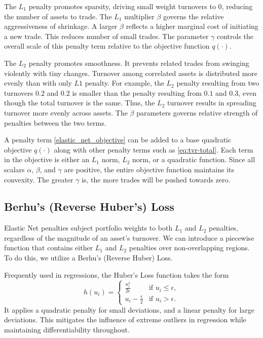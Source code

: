 \documentclass[11pt, letterpaper]{article}
\begin{document}
The $L_1$ penalty promotes sparsity, driving small weight turnovers to $0$, reducing the number of assets to trade. The $L_1$
multiplier $\beta$ governs the relative aggressiveness of shrinkage. A larger $\beta$ reflects a higher marginal cost of
initiating a new trade. This reduces number of small trades. The parameter $\gamma$ controls the overall scale of this penalty
term relative to the objective function $q(\cdot)$.

The ${L_2}$ penalty promotes smoothness. It prevents related trades from swinging violently with tiny changes. Turnover among
correlated assets is distributed more evenly than with only $L1$ penalty. For example, the $L_2$ penalty resulting from two
turnovers $0.2$ and $0.2$ is smaller than the penalty resulting from $0.1$ and $0.3$, even though the total turnover is the
same. Thus, the $L_2$ turnover results in spreading turnover more evenly across assets. The $\beta$ parameters governs relative
strength of penalties between the two terms.

A penalty term \eqref{elastic_net_objective} can be added to a base quadratic objective $q(\cdot)$ along with other penalty
terms such as \eqref{eq:tvr-total}.  Each term in the objective is either an $L_1$ norm, $L_2$ norm, or a quadratic
function. Since all scalars $\alpha$, $\beta$, and $\gamma$ are positive, the entire objective function maintains its
convexity. The greater $\gamma$ is, the more trades will be pushed towards zero.

\subsection{Berhu's (Reverse Huber's) Loss}
Elastic Net penalties subject portfolio weights to both $L_1$ and $L_2$ penalties, regardless of the magnitude of an asset's
turnover.  We can introduce a piecewise function that contains either $L_1$ and $L_2$ penalties over non-overlapping regions. To
do this, we utilize a Berhu's (Reverse Huber) Loss.

Frequently used in regressions, the Huber's Loss function takes the form
\begin{equation}
\label{huber_loss}
    h(u_i) = \begin{cases}
        \frac{u_i^2}{2\epsilon} & \text{if } u_i \leq \epsilon, \\
        u_i - \frac{\epsilon}{2} & \text{if } u_i > \epsilon.
    \end{cases}
\end{equation}
It applies a quadratic penalty for small deviations, and a linear penalty for large deviations. This mitigates the influence of
extreme outliers in regression while maintaining differentiability throughout.
\end{document}
